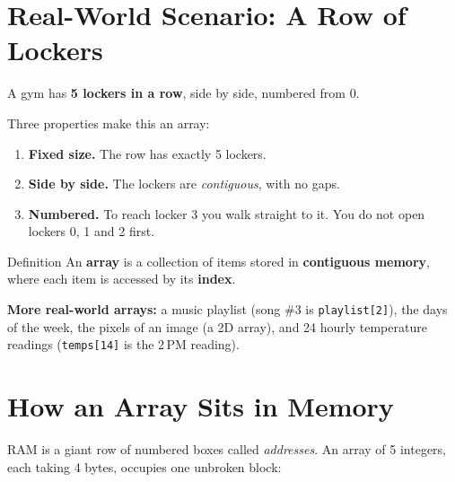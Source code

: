 \documentclass[11pt,a4paper]{article}
\begin{document}
\section{Real-World Scenario: A Row of Lockers}\label{s:locker}

A gym has \textbf{5 lockers in a row}, side by side, numbered from 0.

\begin{center}
\end{center}

Three properties make this an array:

\begin{enumerate}[leftmargin=1.5em,itemsep=2pt]
  \item \textbf{Fixed size.} The row has exactly 5 lockers.
  \item \textbf{Side by side.} The lockers are \emph{contiguous}, with no gaps.
  \item \textbf{Numbered.} To reach locker 3 you walk straight to it. You do not open lockers 0, 1 and 2 first.
\end{enumerate}

\begin{callout}{Definition}
An \textbf{array} is a collection of items stored in \textbf{contiguous memory}, where each item is accessed by its \textbf{index}.
\end{callout}

\textbf{More real-world arrays:}
a music playlist (song \#3 is \texttt{playlist[2]}), the days of the week, the pixels of an image (a 2D array),
and 24 hourly temperature readings (\texttt{temps[14]} is the 2\,PM reading).

\section{How an Array Sits in Memory}\label{s:memory}

RAM is a giant row of numbered boxes called \emph{addresses}. An array of 5 integers, each taking 4 bytes, occupies one unbroken block:
\end{document}
